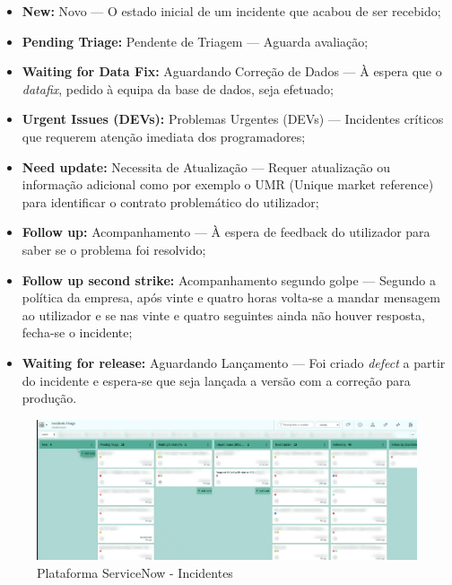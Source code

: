         \begin{itemize}
            \item \textbf{New:} Novo — O estado inicial de um incidente que acabou de ser recebido;
            \item \textbf{Pending Triage:} Pendente de Triagem — Aguarda avaliação;
            \item \textbf{Waiting for Data Fix:} Aguardando Correção de Dados — À espera que o \textit{datafix}, pedido à equipa da base de dados, seja efetuado;
            \item \textbf{Urgent Issues (DEVs):} Problemas Urgentes (DEVs) — Incidentes críticos que requerem atenção imediata dos programadores;
            \item \textbf{Need update:} Necessita de Atualização — Requer atualização ou informação adicional como por exemplo o UMR (Unique market reference) para identificar o contrato problemático do utilizador;
            \item \textbf{Follow up:} Acompanhamento — À espera de feedback do utilizador para saber se o problema foi resolvido;
            \item \textbf{Follow up second strike:} Acompanhamento segundo golpe — Segundo a política da empresa, após vinte e quatro horas volta-se a mandar mensagem ao utilizador e se nas vinte e quatro seguintes ainda não houver resposta, fecha-se o incidente;
            \item \textbf{Waiting for release:} Aguardando Lançamento — Foi criado \textit{defect} a partir do incidente e espera-se que seja lançada a versão com a correção para produção.
        \end{itemize}
        
        \begin{figure}[htbp]
            \centering
            \includegraphics[width=\textwidth]{imgs/ServiceNow2.png}
            \caption{Plataforma ServiceNow - Incidentes}\label{fig:servicenow-ui2}
        \end{figure}

